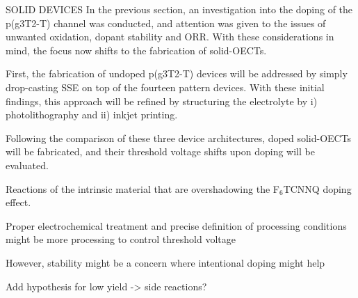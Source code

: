 SOLID DEVICES
In the previous section, an investigation into the doping of the p(g3T2-T) channel was conducted, and attention was given to the issues of unwanted oxidation, dopant stability and ORR. With these considerations in mind, the focus now shifts to the fabrication of solid-OECTs. 

First, the fabrication of undoped p(g3T2-T) devices will be addressed by simply drop-casting SSE on top of the fourteen pattern devices. With these initial findings, this approach will be refined by structuring the electrolyte by i) photolithography \cite{weissbachPhotopatternableSolidElectrolyte2022} and ii) inkjet printing. 

Following the comparison of these three device architectures, doped solid-OECTs will be fabricated, and their threshold voltage shifts upon doping will be evaluated.

Reactions of the intrinsic material that are overshadowing the F$_{6}$TCNNQ doping effect.

Proper electrochemical treatment and precise definition of processing conditions might be more processing to control threshold voltage

However, stability might be a concern where intentional doping might help

Add hypothesis for low yield -> side reactions?


